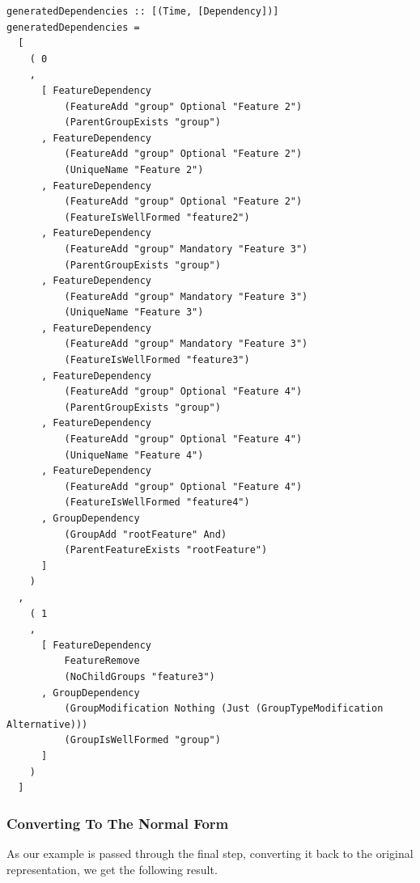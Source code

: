 \documentclass[a4paper,english]{ifimaster}
\begin{document}
\begin{verbatim}
generatedDependencies :: [(Time, [Dependency])]
generatedDependencies =
  [
    ( 0
    ,
      [ FeatureDependency
          (FeatureAdd "group" Optional "Feature 2")
          (ParentGroupExists "group")
      , FeatureDependency
          (FeatureAdd "group" Optional "Feature 2")
          (UniqueName "Feature 2")
      , FeatureDependency
          (FeatureAdd "group" Optional "Feature 2")
          (FeatureIsWellFormed "feature2")
      , FeatureDependency
          (FeatureAdd "group" Mandatory "Feature 3")
          (ParentGroupExists "group")
      , FeatureDependency
          (FeatureAdd "group" Mandatory "Feature 3")
          (UniqueName "Feature 3")
      , FeatureDependency
          (FeatureAdd "group" Mandatory "Feature 3")
          (FeatureIsWellFormed "feature3")
      , FeatureDependency
          (FeatureAdd "group" Optional "Feature 4")
          (ParentGroupExists "group")
      , FeatureDependency
          (FeatureAdd "group" Optional "Feature 4")
          (UniqueName "Feature 4")
      , FeatureDependency
          (FeatureAdd "group" Optional "Feature 4")
          (FeatureIsWellFormed "feature4")
      , GroupDependency
          (GroupAdd "rootFeature" And)
          (ParentFeatureExists "rootFeature")
      ]
    )
  ,
    ( 1
    ,
      [ FeatureDependency
          FeatureRemove
          (NoChildGroups "feature3")
      , GroupDependency
          (GroupModification Nothing (Just (GroupTypeModification Alternative)))
          (GroupIsWellFormed "group")
      ]
    )
  ]
\end{verbatim}

\subsubsection{Converting To The Normal Form}%
\label{ssub:converting_to_the_normal_form}

As our example is passed through the final step, converting it back to the original representation, we get the following result.
\end{document}
